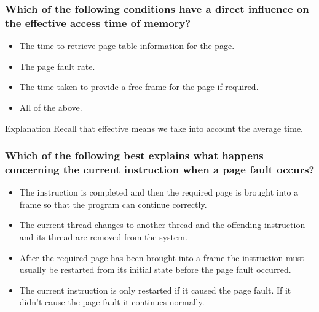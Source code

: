 \documentclass{beamer}
\begin{document}
\begin{frame}
  \frametitle{Which of the following conditions have a direct influence on the effective access time of memory?}
  \begin{itemize}
    \item The time to retrieve page table information for the page.
    \item The page fault rate.
    \item The time taken to provide a free frame for the page if required.
    \item<alert@2> All of the above.
  \end{itemize}
  \pause
  \begin{block}{Explanation}
    Recall that effective means we take into account the average time.
  \end{block}
\end{frame}
\begin{frame}
  \frametitle{Which of the following best explains what happens concerning the current instruction when a page fault occurs?}
  \begin{itemize}
    \item The instruction is completed and then the required page is brought into a frame so that the program can continue correctly.
    \item The current thread changes to another thread and the offending instruction and its thread are removed from the system.
    \item<alert@2> After the required page has been brought into a frame the instruction must usually be restarted from its initial state before the page fault occurred.
    \item The current instruction is only restarted if it caused the page fault. If it didn’t cause the page fault it continues normally.
  \end{itemize}
\end{frame}
\end{document}
